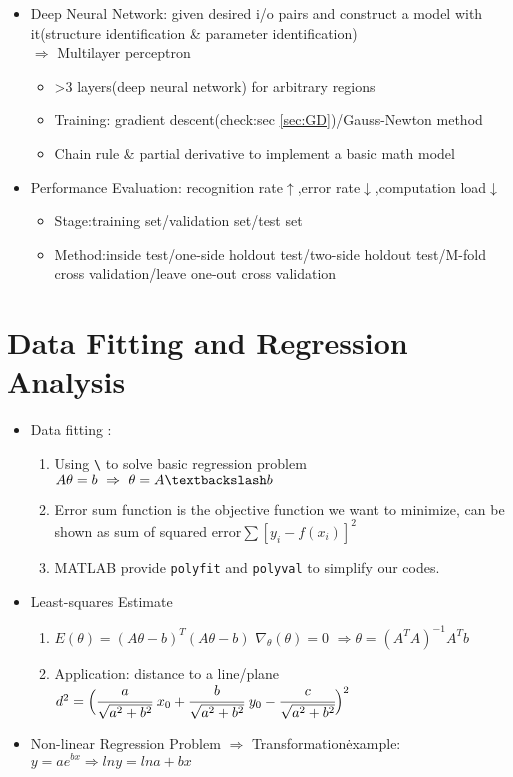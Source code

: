 \documentclass[12pt,a4paper,draft]{article}
\begin{document}
\begin{itemize}
\item Deep Neural Network: given desired i/o pairs and construct a model with it(structure identification \&{} parameter identification)\\
$\Rightarrow$  Multilayer perceptron
\begin{itemize}
\item >3 layers(deep neural network) for arbitrary regions
\item Training: gradient descent(check:sec \ref{sec:GD})/Gauss-Newton method
\item Chain rule \& partial derivative to implement a basic math model
\end{itemize}
\item Performance Evaluation: recognition rate$\uparrow$,error rate$\downarrow$,computation load$\downarrow$
\begin{itemize}
\item Stage:training set/validation set/test set
\item Method:inside test/one-side holdout test/two-side holdout test/M-fold cross validation/leave one-out cross validation 
\end{itemize}
\end{itemize}
\section{Data Fitting and Regression Analysis} %
\begin{itemize}
\item Data fitting :
\begin{enumerate}
\item Using \texttt{\textbackslash} to solve basic regression problem $A\theta = b\ \Rightarrow \ \theta = A\textbackslash b$
\item Error sum function is the  objective function we want to minimize, can be shown as sum of squared error$\sum [y_i -f(x_i)]^2$
\item MATLAB provide \texttt{polyfit} and \texttt{polyval} to simplify our codes.
\end{enumerate}
\item Least-squares Estimate 
\begin{enumerate}
\item $E(\theta) = (A\theta-b)^T(A\theta-b)$ $\nabla_\theta(\theta) = 0 $ $\Rightarrow \theta = (A^TA)^{-1}A^Tb$
\item Application: distance to a line/plane \\
$d^2 = \Big(\cfrac{a}{\sqrt{a^2+b^2}}\ x_0+\cfrac{b}{\sqrt{a^2+b^2}}\ y_0-\cfrac{c}{\sqrt{a^2+b^2}}\Big)^2$
\end{enumerate}
\item Non-linear Regression Problem
$\Rightarrow $ Transformation\. example: $y=ae^{bx} \Rightarrow ln y=ln a +bx$ 
\end{itemize}
\end{document}
